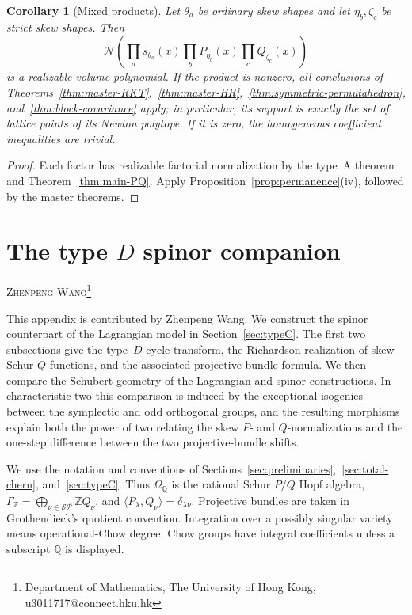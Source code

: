 \documentclass[11pt,a4paper,oneside]{amsart}
\numberwithin{equation}{section}
\newtheorem{corollary}[theorem]{Corollary}
\theoremstyle{definition}
\theoremstyle{remark}
\newcommand{\cN}{\mathcal N}
\begin{document}
\begin{corollary}[Mixed products]\label{cor:mixed-products}
Let $\theta_a$ be ordinary skew shapes and let $\eta_b,\zeta_c$ be strict skew shapes.  Then
\begin{equation}\label{eq:mixed-product}
 \cN\left(
  \prod_a s_{\theta_a}(x)
  \prod_b P_{\eta_b}(x)
  \prod_c Q_{\zeta_c}(x)
 \right)
\end{equation}
is a realizable volume polynomial.  If the product is nonzero, all conclusions of Theorems~\ref{thm:master-RKT},~\ref{thm:master-HR},~\ref{thm:symmetric-permutahedron}, and~\ref{thm:block-covariance} apply; in particular, its support is exactly the set of lattice points of its Newton polytope.  If it is zero, the homogeneous coefficient inequalities are trivial.
\end{corollary}

\begin{proof}
Each factor has realizable factorial normalization by the type~A theorem and Theorem~\ref{thm:main-PQ}.  Apply Proposition~\ref{prop:permanence}(iv), followed by the master theorems.
\end{proof}

\appendix

\section{The type \texorpdfstring{$D$}{D} spinor companion}
\label{appA:main}

\begin{center}
{\large\textsc{Zhenpeng Wang}\footnote{Department of Mathematics, The University of Hong Kong, u3011717@connect.hku.hk}}
\end{center}
\smallskip

\noindent This appendix is contributed by Zhenpeng Wang.  We construct the spinor counterpart of the Lagrangian model in Section~\ref{sec:typeC}.
The first two subsections give the type~$D$ cycle transform, the Richardson
realization of skew Schur $Q$-functions, and the associated
projective-bundle formula.  We then compare the Schubert geometry of the
Lagrangian and spinor constructions.  In characteristic two this comparison
is induced by the exceptional isogenies between the symplectic and odd
orthogonal groups, and the resulting morphisms explain both the power of two
relating the skew $P$- and $Q$-normalizations and the one-step difference
between the two projective-bundle shifts.

We use the notation and conventions of Sections~\ref{sec:preliminaries},~\ref{sec:total-chern}, and~\ref{sec:typeC}.  Thus
$\Omega_{\mathbb Q}$ is the rational Schur $P/Q$ Hopf algebra,
$\Gamma_{\mathbb Z}=\bigoplus_{\nu\in\mathcal{SP}}\mathbb ZQ_\nu$, and
$\langle P_\lambda,Q_\nu\rangle=\delta_{\lambda\nu}$.  Projective bundles
are taken in Grothendieck's quotient convention.  Integration over a
possibly singular variety means operational-Chow degree; Chow groups have
integral coefficients unless a subscript $\mathbb Q$ is displayed.
\end{document}
